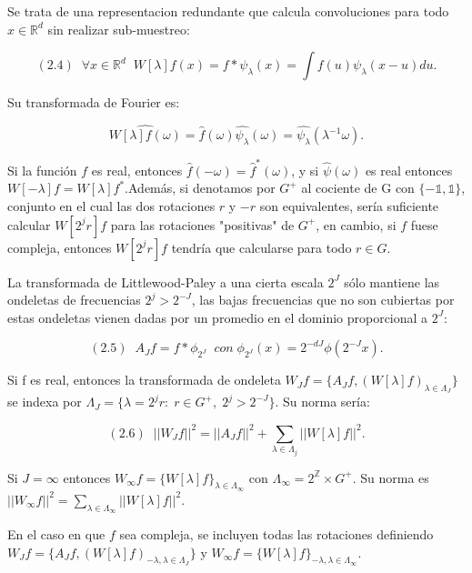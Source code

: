 \noindent Se trata de una representacion redundante que calcula convoluciones para todo $x \in \mathbb{R}^d$ sin realizar sub-muestreo: 

$$(2.4) \; \; \forall x \in  \mathbb{R}^d \;\; W[\lambda]f(x)= f \ast \psi_\lambda(x)=\int f(u)\psi_\lambda(x-u) du .$$

\noindent Su transformada de Fourier es: 

$$\widehat{W[\lambda]f(\omega)}=\widehat{f}(\omega)\widehat{\psi_\lambda}(\omega)=\widehat{\psi_\lambda}(\lambda^{-1}\omega).$$

\noindent Si la función $f$ es real, entonces $\widehat{f}(-\omega)=\widehat{f}^{\ast}(\omega)$, y si $\widehat{\psi}(\omega)$ es real entonces $W[-\lambda]f=W[\lambda]f^{\ast}$.Además, si denotamos por $G^{+}$ al cociente de G con $\lbrace-\mathbb{1},\mathbb{1}\rbrace$, conjunto en el cual las dos rotaciones $r$ y $-r$ son equivalentes, sería suficiente calcular $W[2^jr]f$ para las rotaciones "positivas" de $G^{+}$, en cambio, si $f$ fuese compleja, entonces $W[2^jr]f$ tendría que calcularse para todo $r \in G$. 

\medskip
 
\noindent La transformada de Littlewood-Paley a una cierta escala $2^J$ sólo mantiene las ondeletas de frecuencias $2^j>2^{-J}$, las bajas frecuencias que no son cubiertas por estas ondeletas vienen dadas por un promedio en el dominio proporcional a $2^J$:

$$(2.5) \; \; A_Jf=f \ast \phi_ {2^J} \; \; con \; \phi_ {2^J}(x)=2^{-dJ} \phi(2^{-J}x). $$
\medskip
 
\noindent Si f es real, entonces la transformada de ondeleta $W_Jf=\lbrace A_Jf,(W[\lambda]f)_{\lambda \in \Lambda_J} \rbrace$ se indexa por $\Lambda_J=\lbrace \lambda=2^jr:\;r\in G^{+}, \; 2^j>2^{-J}\rbrace$. Su norma sería: 

$$(2.6) \; \; ||W_Jf||^2=||A_Jf||^2+\sum_{\lambda \in \Lambda_j} ||W[\lambda]f||^2.$$

\medskip
 
\noindent Si $J=\infty$ entonces $W_\infty f=\lbrace W[\lambda]f\rbrace_{\lambda \in \Lambda_\infty}$ con $\Lambda_\infty=2^\mathbb{Z} \times G^{+}$. Su norma es $||W_\infty f||^2=\sum_{\lambda \in \Lambda_\infty} ||W[\lambda]f||^2$.

\noindent En el caso en que $f$ sea compleja, se incluyen todas las rotaciones definiendo $W_Jf=\lbrace A_J f,(W[\lambda]f)_{-\lambda,\lambda \in \Lambda_J} \rbrace$ y $W_\infty f=\lbrace W[\lambda]f\rbrace_{-\lambda,\lambda \in \Lambda_\infty}$. 

